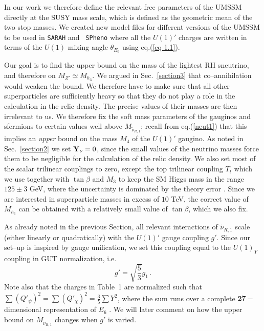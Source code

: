 \documentclass[a4paper,11pt]{article}
\begin{document}
In our work we therefore define the relevant free parameters of the
UMSSM directly at the SUSY mass scale, which is defined as the
geometric mean of the two stop masses. We created new model files for
different versions of the UMSSM to be used in {\tt SARAH} and {\tt
  SPheno} where all the $U(1)'$ charges are written in terms of the
$U(1)$ mixing angle $\theta_{E_6}$ using eq.(\ref{eq 1.1}).

Our goal is to find the upper bound on the mass of the lightest RH
sneutrino, and therefore on $M_{Z'} \simeq M_{h_3}$. We argued in
Sec.~\ref{section3} that co--annihilation would weaken the bound. We
therefore have to make sure that all other superparticles are
sufficiently heavy so that they do not play a role in the calculation
in the relic density. The precise values of their masses are then
irrelevant to us. We therefore fix the soft mass parameters of the
gauginos and sfermions to certain values well above
$M_{\tilde \nu_{R,1}}$; recall from eq.(\ref{neut1}) that this implies
an {\em upper} bound on the mass $M_4$ of the $U(1)'$ gaugino. As
noted in Sec.~\ref{section2} we set ${\bf Y_\nu} = 0$, since the small
values of the neutrino masses force them to be negligible for the
calculation of the relic density. We also set most of the scalar
trilinear couplings to zero, except the top trilinear coupling $T_t$
which we use together with $\tan\beta$ and $M_3$ to keep the SM Higgs
mass in the range $125 \pm 3$ GeV, where the uncertainty is dominated
by the theory error \cite{Carena:2013ytb}. Since we are interested in
superparticle masses in excess of $10$ TeV, the correct value of
$M_{h_1}$ can be obtained with a relatively small value of
$\tan\beta$, which we also fix.

As already noted in the previous Section, all relevant interactions
of $\tilde \nu_{R,1}$ scale (either linearly or quadratically) with 
the $U(1)'$ gauge coupling $g'$. Since our set--up is inspired by
gauge unification, we set this coupling equal to the $U(1)_Y$ coupling
in GUT normalization, i.e.
%
\begin{equation} \label{gprime}
g' = \sqrt{ \frac{5}{3}} g_1\,.
\end{equation}
%
Note also that the charges in Table~1 are normalized such that
$\sum \left( Q'_\psi \right)^2 = \sum \left( Q'_\chi \right)^2 =
\frac{3}{5} \sum Y^2$, where the sum runs over a complete 
$\mathbf{27}-$dimensional representation of $E_6$ \cite{London:1986dk}.
We will later comment on how the upper bound on $M_{\tilde \nu_{R,1}}$
changes when $g'$ is varied.
\end{document}
